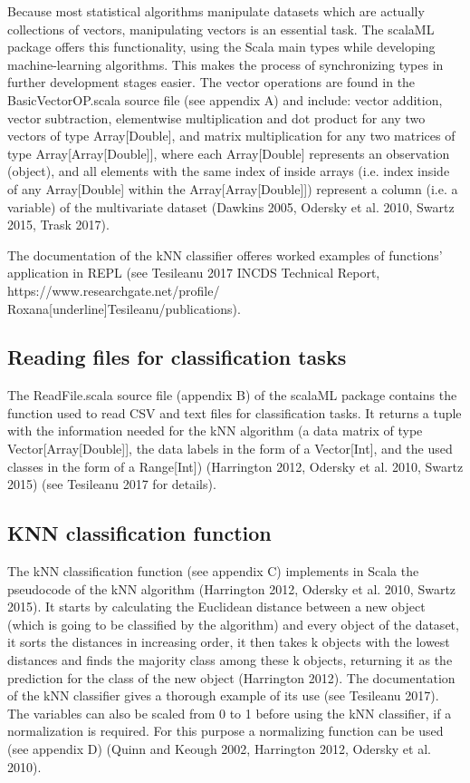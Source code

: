 \documentclass[journal]{IEEEtran}
\begin{document}
Because most statistical algorithms manipulate datasets which are actually collections of vectors, manipulating vectors is an essential task. The scalaML package offers this functionality, using the Scala main types while developing machine-learning algorithms. This makes the process of synchronizing types in further development stages easier.
 The vector operations are found in the BasicVectorOP.scala source file (see appendix A) and include: vector addition, vector subtraction, elementwise multiplication and dot product for any two vectors of type Array[Double], and matrix multiplication for any two matrices of type Array[Array[Double]], where each Array[Double] represents an observation (object), and all elements with the same index of inside arrays (i.e. index inside of any Array[Double] within the Array[Array[Double]]) represent a column (i.e. a variable) of the multivariate dataset (Dawkins 2005, Odersky et al. 2010, Swartz 2015, Trask 2017).

The documentation of the kNN classifier offeres worked examples of functions' application in REPL (see Tesileanu 2017 INCDS Technical Report, https://www.researchgate.net/profile/\\ Roxana[underline]Tesileanu/publications).  

\subsection{Reading files for classification tasks}

The ReadFile.scala source file (appendix B) of the scalaML package contains the function used to read CSV and text files for classification tasks. It returns a tuple with the information needed for the kNN algorithm (a data matrix of type Vector[Array[Double]], the data labels in the form of a Vector[Int],  and the used classes in the form of a Range[Int]) (Harrington 2012, Odersky et al. 2010, Swartz 2015) (see Tesileanu 2017 for details).
 
\subsection{KNN classification function}

The kNN classification function (see appendix C) implements in Scala the pseudocode of the kNN algorithm (Harrington 2012, Odersky et al. 2010, Swartz 2015). 
It starts by calculating the Euclidean distance between a new object (which is going to be classified by the algorithm) and every object of the dataset, it sorts the distances in increasing order, it then takes k objects with the lowest distances and finds the majority class among these k objects, returning it as the prediction for the class of the new object (Harrington 2012).
The documentation of the kNN classifier gives a thorough example of its use (see Tesileanu 2017). 
The variables can also be scaled from 0 to 1 before using the kNN classifier, if a normalization is required. For this purpose a normalizing function can be used (see appendix D) (Quinn and Keough 2002, Harrington 2012, Odersky et al. 2010). 
\end{document}
